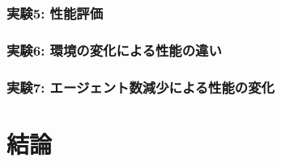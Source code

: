 \documentclass[12pt,a4j,twoside]{jarticle}
\begin{document}
  \subsubsection{実験5: 性能評価}\label{ex:ERC1}
  
  \subsubsection{実験6: 環境の変化による性能の違い}\label{ex:ERC2}  
  
  \subsubsection{実験7: エージェント数減少による性能の変化}

  \section{結論}

  \clearpage
  
  
\end{document}
